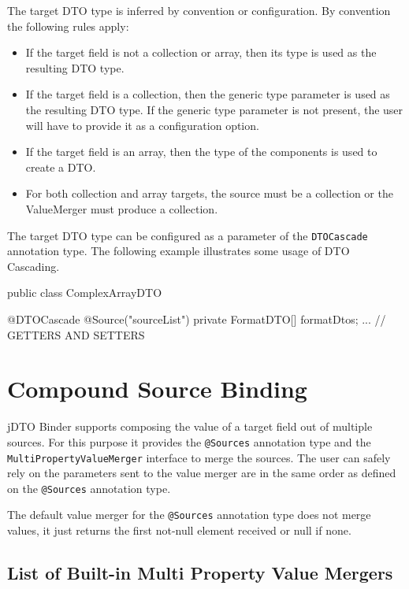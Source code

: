 \documentclass[11pt]{article}
\newcommand{\JDTO}{jDTO Binder\xspace}
\begin{document}
The target DTO type is inferred by convention or configuration. By convention the following rules apply:


\begin{itemize}
 \item If the target field is not a collection or array, then its type is used as the resulting DTO type.
 \item If the target field is a collection, then the generic type parameter is used as the resulting DTO type. If the generic type parameter is not present, the user will have to provide it as a configuration option.
 \item If the target field is an array, then the type of the components is used to create a DTO.
 \item For both collection and array targets, the source must be a collection or the ValueMerger must produce a collection.
\end{itemize}

The target DTO type can be configured as a parameter of the \texttt{DTOCascade} annotation type. The following example illustrates some usage of DTO Cascading.


\begin{java}
 public class ComplexArrayDTO {
    
    @DTOCascade
    @Source("sourceList")
    private FormatDTO[] formatDtos;
    ... // GETTERS AND SETTERS
}
\end{java}

\section{Compound Source Binding}

\JDTO supports composing the value of a target field out of multiple sources. For this purpose it provides the \texttt{@Sources} annotation type and the \texttt{MultiPropertyValueMerger} interface to merge the sources.
The user can safely rely on the parameters sent to the value merger are in the same order as defined on the \texttt{@Sources} annotation type.

The default value merger for the \texttt{@Sources} annotation type does not merge values, it just returns the first not-null element received or null if none.

\subsection{List of Built-in Multi Property Value Mergers}
\end{document}
